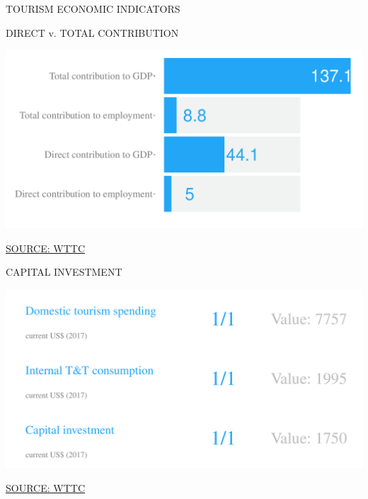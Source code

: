\documentclass{article}\usepackage[]{graphicx}\usepackage[]{color}
\makeatletter
\def\maxwidth{ %
  \ifdim\Gin@nat@width>\linewidth
    \linewidth
  \else
    \Gin@nat@width
  \fi
}
\makeatother
\begin{document}
\clearpage

\begin{minipage}[c]{0.95\textwidth}
  \vspace{5ex}
  \begin{flushleft}  
    \hspace{4ex}\Large{\textcolor[HTML]{FF4023}{TOURISM ECONOMIC INDICATORS}}\hspace{2ex}\small{\textcolor[HTML]{818181}{}}
  \end{flushleft}
  \begin{minipage}[c]{0.5\textwidth}  
    \hspace{4ex}\small{\textcolor[HTML]{818181}{DIRECT v. TOTAL CONTRIBUTION}}
    \vspace{1ex}


{\centering \includegraphics[width=\maxwidth]{figure/bar2_1-1} 

}



    \hspace{4ex}\scriptsize{\href{NA}{\textcolor[HTML]{FF4023}{SOURCE: WTTC}}}
  \end{minipage}
  \begin{minipage}[c]{0.5\textwidth} 
    \hspace{4ex}\small{\textcolor[HTML]{818181}{CAPITAL INVESTMENT}}
    \vspace{1ex}


{\centering \includegraphics[width=\maxwidth]{figure/number2_1-1} 

}



    \hspace{4ex}\scriptsize{\href{NA}{\textcolor[HTML]{FF4023}{SOURCE: WTTC}}}
  \end{minipage}
\end{minipage}      
\end{document}
